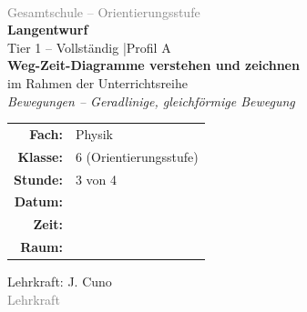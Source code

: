 \documentclass[11pt,a4paper]{article}
\newcommand{\fach}{Physik}
\newcommand{\jahrgangsstufe}{6}
\newcommand{\schulart}{Gesamtschule}
\newcommand{\kursart}{Orientierungsstufe}
\newcommand{\stundenthema}{Weg-Zeit-Diagramme verstehen und zeichnen}
\newcommand{\reihenthema}{Bewegungen -- Geradlinige, gleichförmige Bewegung}
\newcommand{\stundennummer}{3}
\newcommand{\reihenstunden}{4}
\newcommand{\lehrkraft}{J. Cuno}
\newcommand{\ausbildungsstand}{Lehrkraft}
\begin{document}
\begin{titlepage}
    \centering
    \vspace*{2cm}

    {\Large\textcolor{gray}{}}\\[0.5cm]
    {\large\textcolor{gray}{\schulart{} -- Orientierungsstufe}}\\[2cm]

    {\Huge\textcolor{fach}{\textbf{Langentwurf}}}\\[0.5cm]
    {\large Tier 1 -- Vollständig \quad|\quad Profil A}\\[2cm]

    {\LARGE\textbf{\stundenthema}}\\[0.5cm]
    {\large im Rahmen der Unterrichtsreihe}\\[0.3cm]
    {\Large\textit{\reihenthema}}\\[2cm]

    \begin{tabular}{rl}
        \textbf{Fach:} & \fach \\[0.3cm]
        \textbf{Klasse:} & \jahrgangsstufe{} (\kursart) \\[0.3cm]
        \textbf{Stunde:} & \stundennummer{} von \reihenstunden \\[0.3cm]
        \textbf{Datum:} & \underline{\hspace{3cm}} \\[0.3cm]
        \textbf{Zeit:} & \underline{\hspace{3cm}} \\[0.3cm]
        \textbf{Raum:} & \underline{\hspace{3cm}} \\[0.3cm]
    \end{tabular}

    \vfill

    {\large Lehrkraft: \lehrkraft}\\[0.3cm]
    {\normalsize\textcolor{gray}{\ausbildungsstand}}\\[1cm]

\end{titlepage}

\tableofcontents
\newpage
\end{document}
